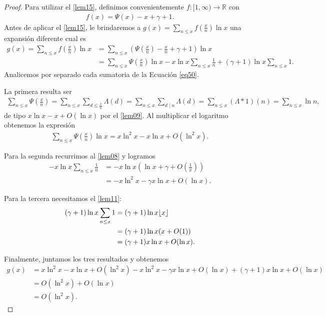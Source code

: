 \documentclass[10pt]{article}
\DeclarePairedDelimiter\floor{\lfloor}{\rfloor}
\theoremstyle{definition}
\theoremstyle{remark}
\newcommand{\BR}{\mathbb R}
\begin{document}
\begin{proof}
Para utilizar el \cref{lem15}, definimos convenientemente $f : [1, \infty) \to \BR$ con
\begin{align}
f(x) = \Psi(x) - x + \gamma + 1.
\end{align}
Antes de aplicar el \cref{lem15}, le brindaremos a $g(x) = \sum_{n \leq x} f\left(\frac{x}{n}\right)\ln x$ 
una expansi\'on diferente cual es 
\begin{align}
g(x)= \sum_{n \leq x} f\left(\frac{x}{n}\right)\ln x &= \sum_{n \leq x} \left(\Psi\left(\frac{x}{n}\right) - \frac{x}{n} + \gamma + 1\right) \ln x \\
&= \sum_{n \leq x} \Psi\left(\frac{x}{n}\right) \ln x - x \ln x \sum_{n \leq x} \frac{1}{n} + (\gamma + 1) \ln x \sum_{n \leq x} 1.\label{eq50}
\end{align}
Analicemos por separado cada sumatoria de la Ecuaci\'on \ref{eq50}.

La primera resulta ser 
\begin{align}
\sum_{n \leq x} \Psi\left(\frac{x}{n}\right) = \sum_{n \leq x} \sum_{d \leq \frac{x}{n}} \Lambda(d) = 
 \sum_{n \leq x} \sum_{d \mid n} \Lambda(d) = 
 \sum_{n \leq x} (\Lambda * 1)(n) = 
\sum_{n \leq x} \ln n, 
\end{align}
de tipo $x\ln x - x + O(\ln x)$ por el \cref{lem09}.
Al multiplicar el logaritmo obtenemos la expresi\'on
\begin{align}
\sum_{n \leq x} \Psi\left(\frac{x}{n}\right)\ln x = x \ln^2 x - x \ln x + O(\ln^2 x).
\end{align}

Para la segunda recurrimos al \cref{lem08} y logramos 
\begin{align}
-x \ln x \sum_{n \leq x} \frac{1}{n} &= -x \ln x \left(\ln x + \gamma + O\left(\frac{1}{x}\right)\right) \\
&= -x \ln^2 x - \gamma x \ln x + O(\ln x).
\end{align}

Para la tercera necesitamos el \cref{lem11}: 
\begin{align}
(\gamma + 1) \ln x \sum_{n \leq x} 1 &= (\gamma + 1) \ln x \floor{x} \\
&= (\gamma + 1) \ln x (x + O(1)) \\
&= (\gamma + 1) x \ln x + O(\ln x).
\end{align}

Finalmente, juntamos los tres resultados y obtenemos
\begin{align}
g(x) &= x \ln^2 x - x \ln x + O(\ln^2 x) - x \ln^2 x - \gamma x \ln x + O(\ln x) + (\gamma + 1) x \ln x + O(\ln x) \\
&= O(\ln^2 x) + O(\ln x) \\
&= O(\ln^2 x). 
\end{align}


\end{proof}
\end{document}
